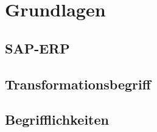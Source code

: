\section{Grundlagen}
\subsection{SAP-ERP}
\subsection{Transformationsbegriff}
\subsection{Begrifflichkeiten}